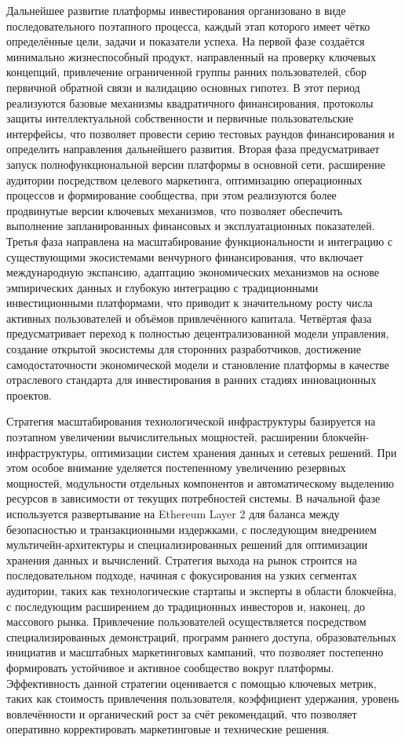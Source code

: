 \documentclass[
    candidate, %
    subf, %
    dotsinheaders=false,
]{disser}
\begin{document}
Дальнейшее развитие платформы инвестирования организовано в виде последовательного поэтапного процесса, каждый этап которого имеет чётко определённые цели, задачи и показатели успеха. На первой фазе создаётся минимально жизнеспособный продукт, направленный на проверку ключевых концепций, привлечение ограниченной группы ранних пользователей, сбор первичной обратной связи и валидацию основных гипотез. В этот период реализуются базовые механизмы квадратичного финансирования, протоколы защиты интеллектуальной собственности и первичные пользовательские интерфейсы, что позволяет провести серию тестовых раундов финансирования и определить направления дальнейшего развития. Вторая фаза предусматривает запуск полнофункциональной версии платформы в основной сети, расширение аудитории посредством целевого маркетинга, оптимизацию операционных процессов и формирование сообщества, при этом реализуются более продвинутые версии ключевых механизмов, что позволяет обеспечить выполнение запланированных финансовых и эксплуатационных показателей. Третья фаза направлена на масштабирование функциональности и интеграцию с существующими экосистемами венчурного финансирования, что включает международную экспансию, адаптацию экономических механизмов на основе эмпирических данных и глубокую интеграцию с традиционными инвестиционными платформами, что приводит к значительному росту числа активных пользователей и объёмов привлечённого капитала. Четвёртая фаза предусматривает переход к полностью децентрализованной модели управления, создание открытой экосистемы для сторонних разработчиков, достижение самодостаточности экономической модели и становление платформы в качестве отраслевого стандарта для инвестирования в ранних стадиях инновационных проектов.

Стратегия масштабирования технологической инфраструктуры базируется на поэтапном увеличении вычислительных мощностей, расширении блокчейн-инфраструктуры, оптимизации систем хранения данных и сетевых решений. При этом особое внимание уделяется постепенному увеличению резервных мощностей, модульности отдельных компонентов и автоматическому выделению ресурсов в зависимости от текущих потребностей системы. В начальной фазе используется развертывание на Ethereum Layer 2 для баланса между безопасностью и транзакционными издержками, с последующим внедрением мультичейн-архитектуры и специализированных решений для оптимизации хранения данных и вычислений. Стратегия выхода на рынок строится на последовательном подходе, начиная с фокусирования на узких сегментах аудитории, таких как технологические стартапы и эксперты в области блокчейна, с последующим расширением до традиционных инвесторов и, наконец, до массового рынка. Привлечение пользователей осуществляется посредством специализированных демонстраций, программ раннего доступа, образовательных инициатив и масштабных маркетинговых кампаний, что позволяет постепенно формировать устойчивое и активное сообщество вокруг платформы. Эффективность данной стратегии оценивается с помощью ключевых метрик, таких как стоимость привлечения пользователя, коэффициент удержания, уровень вовлечённости и органический рост за счёт рекомендаций, что позволяет оперативно корректировать маркетинговые и технические решения.
\end{document}
